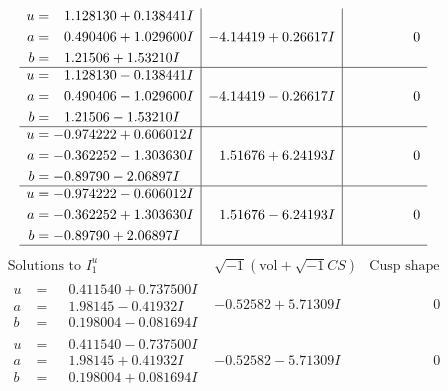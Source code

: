 \documentclass[1p]{elsarticle_modified}
\theoremstyle{definition}
\newcommand{\I}{\sqrt{-1}}
\begin{document}
$$\begin{array}{c|c|c}
\begin{aligned}
u &= \phantom{-}1.128130 + 0.138441 I \\
a &= \phantom{-}0.490406 + 1.029600 I \\
b &= \phantom{-}1.21506 + 1.53210 I\end{aligned}
 & -4.14419 + 0.26617 I & \phantom{-0.000000 } 0 \\ \hline\begin{aligned}
u &= \phantom{-}1.128130 - 0.138441 I \\
a &= \phantom{-}0.490406 - 1.029600 I \\
b &= \phantom{-}1.21506 - 1.53210 I\end{aligned}
 & -4.14419 - 0.26617 I & \phantom{-0.000000 } 0 \\ \hline\begin{aligned}
u &= -0.974222 + 0.606012 I \\
a &= -0.362252 - 1.303630 I \\
b &= -0.89790 - 2.06897 I\end{aligned}
 & \phantom{-}1.51676 + 6.24193 I & \phantom{-0.000000 } 0 \\ \hline\begin{aligned}
u &= -0.974222 - 0.606012 I \\
a &= -0.362252 + 1.303630 I \\
b &= -0.89790 + 2.06897 I\end{aligned}
 & \phantom{-}1.51676 - 6.24193 I & \phantom{-0.000000 } 0\\
 \hline 
 \end{array}$$\newpage$$\begin{array}{c|c|c}  
\text{Solutions to }I^u_{1}& \I (\text{vol} + \sqrt{-1}CS) & \text{Cusp shape}\\
 \hline 
\begin{aligned}
u &= \phantom{-}0.411540 + 0.737500 I \\
a &= \phantom{-}1.98145 - 0.41932 I \\
b &= \phantom{-}0.198004 - 0.081694 I\end{aligned}
 & -0.52582 + 5.71309 I & \phantom{-0.000000 } 0 \\ \hline\begin{aligned}
u &= \phantom{-}0.411540 - 0.737500 I \\
a &= \phantom{-}1.98145 + 0.41932 I \\
b &= \phantom{-}0.198004 + 0.081694 I\end{aligned}
 & -0.52582 - 5.71309 I & \phantom{-0.000000 } 0 \\ \hline\begin{aligned}

\end{aligned}
\end{array}$$
\end{document}
